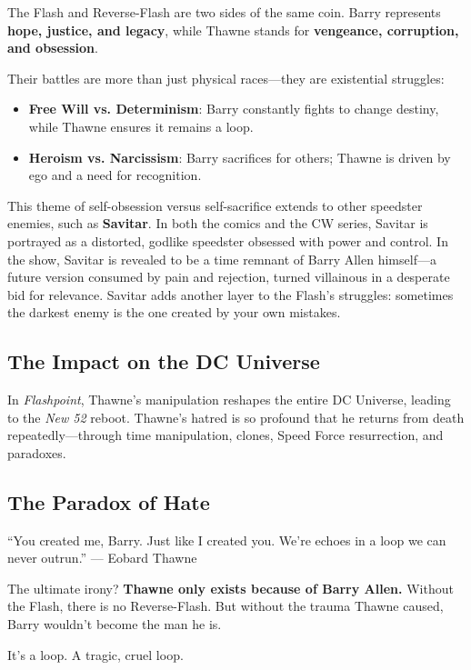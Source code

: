 The Flash and Reverse-Flash are two sides of the same coin. Barry represents \textbf{hope, justice, and legacy}, while Thawne stands for \textbf{vengeance, corruption, and obsession}.

Their battles are more than just physical races---they are existential struggles:
\begin{itemize}
  \item \textbf{Free Will vs. Determinism}: Barry constantly fights to change destiny, while Thawne ensures it remains a loop.
  \item \textbf{Heroism vs. Narcissism}: Barry sacrifices for others; Thawne is driven by ego and a need for recognition.
\end{itemize}

This theme of self-obsession versus self-sacrifice extends to other speedster enemies, such as \textbf{Savitar}. In both the comics and the CW series, Savitar is portrayed as a distorted, godlike speedster obsessed with power and control. In the show, Savitar is revealed to be a time remnant of Barry Allen himself---a future version consumed by pain and rejection, turned villainous in a desperate bid for relevance. Savitar adds another layer to the Flash's struggles: sometimes the darkest enemy is the one created by your own mistakes.

\subsection*{The Impact on the DC Universe}
In \textit{Flashpoint}, Thawne’s manipulation reshapes the entire DC Universe, leading to the \textit{New 52} reboot. Thawne’s hatred is so profound that he returns from death repeatedly---through time manipulation, clones, Speed Force resurrection, and paradoxes.

\subsection*{The Paradox of Hate}
\begin{magquote}
“You created me, Barry. Just like I created you. We’re echoes in a loop we can never outrun.”  
\hfill --- Eobard Thawne
\end{magquote}

The ultimate irony? \textbf{Thawne only exists because of Barry Allen.} Without the Flash, there is no Reverse-Flash. But without the trauma Thawne caused, Barry wouldn’t become the man he is.

It’s a loop. A tragic, cruel loop.

